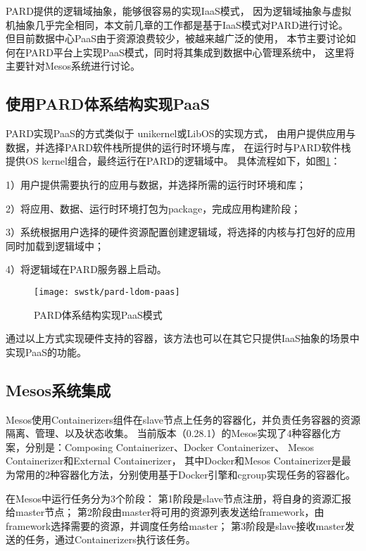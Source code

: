 PARD提供的逻辑域抽象，能够很容易的实现IaaS模式，
因为逻辑域抽象与虚拟机抽象几乎完全相同，本文前几章的工作都是基于IaaS模式对PARD进行讨论。
但目前数据中心PaaS由于资源浪费较少，被越来越广泛的使用，
本节主要讨论如何在PARD平台上实现PaaS模式，同时将其集成到数据中心管理系统中，
这里将主要针对Mesos系统进行讨论。

\subsection{使用PARD体系结构实现PaaS}
PARD实现PaaS的方式类似于
unikernel\cite{Unikernels:2013}或LibOS\cite{Porter:2011}的实现方式，
由用户提供应用与数据，并选择PARD软件栈所提供的运行时环境与库，
在运行时与PARD软件栈提供OS kernel组合，最终运行在PARD的逻辑域中。
具体流程如下，如图\ref{fig:pard-ldom-paas}：

1）用户提供需要执行的应用与数据，并选择所需的运行时环境和库；

2）将应用、数据、运行时环境打包为package，完成应用构建阶段；

3）系统根据用户选择的硬件资源配置创建逻辑域，将选择的内核与打包好的应用同时加载到逻辑域中；

4）将逻辑域在PARD服务器上启动。

\begin{figure}[tb]
  \centering
  \texttt{[image: swstk/pard-ldom-paas]}
  \caption{PARD体系结构实现PaaS模式}
  \label{fig:pard-ldom-paas}
\end{figure}

通过以上方式实现硬件支持的容器，该方法也可以在其它只提供IaaS抽象的场景中实现PaaS的功能。

\subsection{Mesos系统集成}

Mesos使用Containerizers组件在slave节点上任务的容器化，并负责任务容器的资源隔离、管理、以及状态收集。
当前版本（0.28.1）的Mesos实现了4种容器化方案，分别是：Composing Containerizer、Docker Containerizer、
Mesos Containerizer和External Containerizer，
其中Docker和Mesos Containerizer是最为常用的2种容器化方法，分别使用基于Docker引擎和cgroup实现任务的容器化。

在Mesos中运行任务分为3个阶段：
第1阶段是slave节点注册，将自身的资源汇报给master节点；
第2阶段由master将可用的资源列表发送给framework，由framework选择需要的资源，并调度任务给master；
第3阶段是slave接收master发送的任务，通过Containerizers执行该任务。


